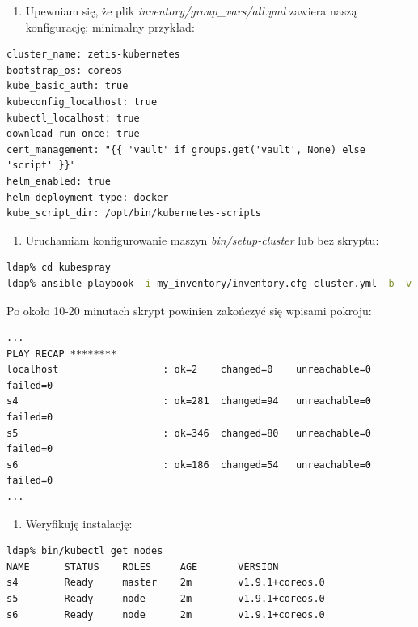 \documentclass[a4paper,12pt,twoside,openany]{report}
\providecommand{\tightlist}{%
  \setlength{\itemsep}{0pt}\setlength{\parskip}{0pt}}
\begin{document}
\begin{enumerate}
\def\labelenumi{\arabic{enumi}.}
\setcounter{enumi}{6}
\tightlist
\item
  Upewniam się, że plik \emph{inventory/group\_vars/all.yml} zawiera
  naszą konfigurację; minimalny przykład:
\end{enumerate}

\begin{lstlisting}
cluster_name: zetis-kubernetes
bootstrap_os: coreos
kube_basic_auth: true
kubeconfig_localhost: true
kubectl_localhost: true
download_run_once: true
cert_management: "{{ 'vault' if groups.get('vault', None) else 'script' }}"
helm_enabled: true
helm_deployment_type: docker
kube_script_dir: /opt/bin/kubernetes-scripts
\end{lstlisting}

\begin{enumerate}
\def\labelenumi{\arabic{enumi}.}
\setcounter{enumi}{7}
\tightlist
\item
  Uruchamiam konfigurowanie maszyn \emph{bin/setup-cluster} lub bez
  skryptu:
\end{enumerate}

\begin{lstlisting}[language=bash]
ldap% cd kubespray
ldap% ansible-playbook -i my_inventory/inventory.cfg cluster.yml -b -v
\end{lstlisting}

Po około 10-20 minutach skrypt powinien zakończyć się wpisami pokroju:

\begin{lstlisting}
...
PLAY RECAP ********
localhost                  : ok=2    changed=0    unreachable=0    failed=0   
s4                         : ok=281  changed=94   unreachable=0    failed=0   
s5                         : ok=346  changed=80   unreachable=0    failed=0   
s6                         : ok=186  changed=54   unreachable=0    failed=0   
...
\end{lstlisting}

\begin{enumerate}
\def\labelenumi{\arabic{enumi}.}
\setcounter{enumi}{8}
\tightlist
\item
  Weryfikuję instalację:
\end{enumerate}

\begin{lstlisting}[language=bash]
ldap% bin/kubectl get nodes
NAME      STATUS    ROLES     AGE       VERSION
s4        Ready     master    2m        v1.9.1+coreos.0
s5        Ready     node      2m        v1.9.1+coreos.0
s6        Ready     node      2m        v1.9.1+coreos.0
\end{lstlisting}
\end{document}

